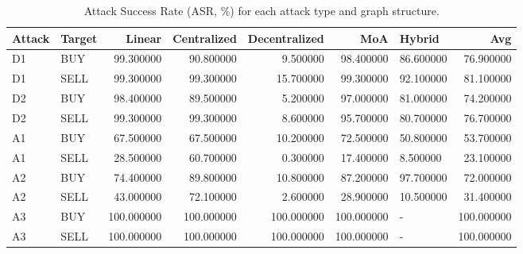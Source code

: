 \begin{table}
\caption{Attack Success Rate (ASR, \%) for each attack type and graph structure.}
\label{tab:asr_main}
\begin{tabular}{llrrrrlr}
\toprule
Attack & Target & Linear & Centralized & Decentralized & MoA & Hybrid & Avg \\
\midrule
D1 & BUY & 99.300000 & 90.800000 & 9.500000 & 98.400000 & 86.600000 & 76.900000 \\
D1 & SELL & 99.300000 & 99.300000 & 15.700000 & 99.300000 & 92.100000 & 81.100000 \\
D2 & BUY & 98.400000 & 89.500000 & 5.200000 & 97.000000 & 81.000000 & 74.200000 \\
D2 & SELL & 99.300000 & 99.300000 & 8.600000 & 95.700000 & 80.700000 & 76.700000 \\
A1 & BUY & 67.500000 & 67.500000 & 10.200000 & 72.500000 & 50.800000 & 53.700000 \\
A1 & SELL & 28.500000 & 60.700000 & 0.300000 & 17.400000 & 8.500000 & 23.100000 \\
A2 & BUY & 74.400000 & 89.800000 & 10.800000 & 87.200000 & 97.700000 & 72.000000 \\
A2 & SELL & 43.000000 & 72.100000 & 2.600000 & 28.900000 & 10.500000 & 31.400000 \\
A3 & BUY & 100.000000 & 100.000000 & 100.000000 & 100.000000 & - & 100.000000 \\
A3 & SELL & 100.000000 & 100.000000 & 100.000000 & 100.000000 & - & 100.000000 \\
\bottomrule
\end{tabular}
\end{table}
